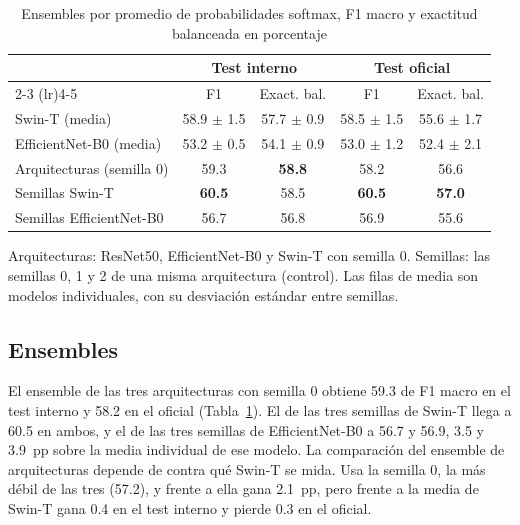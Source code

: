 \documentclass[conference]{IEEEtran}
\begin{document}
\begin{table}[!t]
\centering
\caption{Ensembles por promedio de probabilidades softmax, F1 macro y exactitud balanceada en porcentaje}
\label{tab:ensembles}
\footnotesize
\setlength{\tabcolsep}{2pt}
\begin{tabular}{lcccc}
\toprule
 & \multicolumn{2}{c}{Test interno} & \multicolumn{2}{c}{Test oficial} \\
\cmidrule(lr){2-3} \cmidrule(lr){4-5}
 & F1 & Exact. bal. & F1 & Exact. bal. \\
\midrule
Swin-T (media) & 58.9 $\pm$ 1.5 & 57.7 $\pm$ 0.9 & 58.5 $\pm$ 1.5 & 55.6 $\pm$ 1.7 \\
EfficientNet-B0 (media) & 53.2 $\pm$ 0.5 & 54.1 $\pm$ 0.9 & 53.0 $\pm$ 1.2 & 52.4 $\pm$ 2.1 \\
\midrule
Arquitecturas (semilla 0) & 59.3 & \textbf{58.8} & 58.2 & 56.6 \\
Semillas Swin-T & \textbf{60.5} & 58.5 & \textbf{60.5} & \textbf{57.0} \\
Semillas EfficientNet-B0 & 56.7 & 56.8 & 56.9 & 55.6 \\
\bottomrule
\end{tabular}
\par\vspace{2pt}
\parbox{\columnwidth}{\scriptsize Arquitecturas: ResNet50, EfficientNet-B0 y Swin-T con semilla 0. Semillas: las semillas 0, 1 y 2 de una misma arquitectura (control). Las filas de media son modelos individuales, con su desviación estándar entre semillas.}
\end{table}

\subsection{Ensembles}

El ensemble de las tres arquitecturas con semilla 0 obtiene 59.3 de F1 macro en el test interno y 58.2 en el oficial (Tabla~\ref{tab:ensembles}). El de las tres semillas de Swin-T llega a 60.5 en ambos, y el de las tres semillas de EfficientNet-B0 a 56.7 y 56.9, 3.5 y 3.9~pp sobre la media individual de ese modelo. La comparación del ensemble de arquitecturas depende de contra qué Swin-T se mida. Usa la semilla 0, la más débil de las tres (57.2), y frente a ella gana 2.1~pp, pero frente a la media de Swin-T gana 0.4 en el test interno y pierde 0.3 en el oficial.
\end{document}
